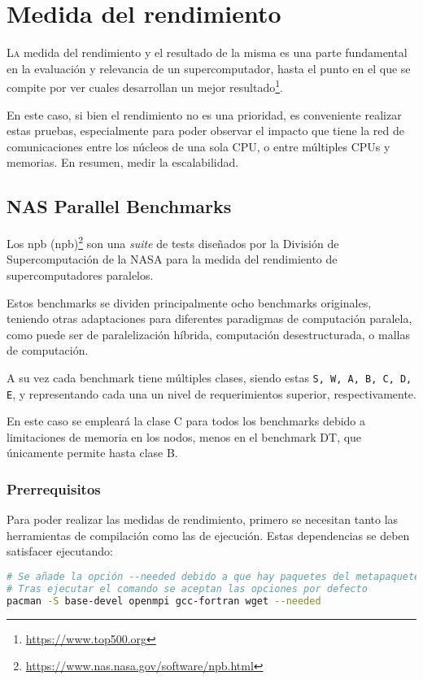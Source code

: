 \chapter{Medida del rendimiento}
\label{chap:medida_rendimiento}

\lettrine{L}{a} medida del rendimiento y el resultado de la misma es una parte fundamental en la evaluación y relevancia de un supercomputador, hasta el punto en el que se compite por ver cuales desarrollan un mejor resultado\footnote{\url{https://www.top500.org}}.

En este caso, si bien el rendimiento no es una prioridad, es conveniente realizar estas pruebas, especialmente para poder observar el impacto que tiene la red de comunicaciones entre los núcleos de una sola CPU, o entre múltiples CPUs y memorias. En resumen, medir la escalabilidad.

\section{NAS Parallel Benchmarks}
Los \acrlong{npb} (\acrshort{npb})\footnote{\url{https://www.nas.nasa.gov/software/npb.html}} son una \textit{suite} de tests diseñados por la División de Supercomputación de la NASA para la medida del rendimiento de supercomputadores paralelos.

Estos benchmarks se dividen principalmente ocho benchmarks originales, teniendo otras adaptaciones para diferentes paradigmas de computación paralela, como puede ser de paralelización híbrida, computación desestructurada, o mallas de computación.

A su vez cada benchmark tiene múltiples clases, siendo estas \texttt{S, W, A, B, C, D, E}, y representando cada una un nivel de requerimientos superior, respectivamente.

En este caso se empleará la clase C para todos los benchmarks debido a limitaciones de memoria en los nodos, menos en el benchmark DT, que únicamente permite hasta clase B.

\subsection{Prerrequisitos}
Para poder realizar las medidas de rendimiento, primero se necesitan tanto las herramientas de compilación como las de ejecución. Estas dependencias se deben satisfacer ejecutando:

\begin{lstlisting}[language=bash]
# Se añade la opción --needed debido a que hay paquetes del metapaquete base-devel que ya están instalados, y no es necesario reinstalar.
# Tras ejecutar el comando se aceptan las opciones por defecto
pacman -S base-devel openmpi gcc-fortran wget --needed
\end{lstlisting}


